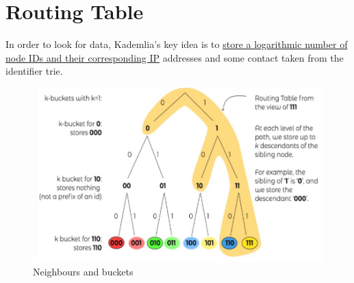 \section{Routing Table}
In order to look for data, Kademlia's key idea is to \ul{store a logarithmic number of node IDs and their corresponding IP} addresses and some contact taken from the identifier trie.

\begin{figure}[htbp]
   \centering
   \includegraphics{images/kademlia_routingtable.png}
   \caption{Neighbours and buckets}
   \label{fig:kademlia_routingtable.png}
\end{figure}


